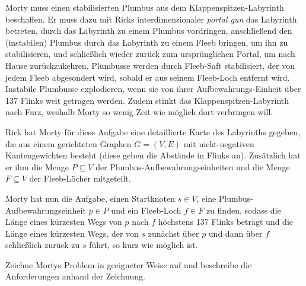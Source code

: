 \documentclass{uebung_cs}
\begin{document}
\begin{exercise}
  Morty muss einen stabilisierten Plumbus aus dem Klappen\-spitzen-Labyrinth beschaffen.
  Er muss dazu mit Ricks interdimensionaler \textit{portal gun} das Labyrinth betreten, durch das Labyrinth zu einem Plumbus vordringen, anschließend den (instabilen) Plumbus durch das Labyrinth zu einem Fleeb bringen, um ihn zu stabilisieren, und schließlich wieder zurück zum ursprünglichen Portal, um nach Hause zurückzukehren.
  Plumbusse werden durch Fleeb-Saft stabilisiert, der von jedem Fleeb abgesondert wird, sobald er aus seinem Fleeb-Loch entfernt wird.
  Instabile Plumbusse explodieren, wenn sie von ihrer Aufbewahrungs-Einheit über 137 Flinks weit getragen werden.
  Zudem stinkt das Klappenspitzen-Labyrinth nach Furz, weshalb Morty so wenig Zeit wie möglich dort verbringen will.

  Rick hat Morty für diese Aufgabe eine detaillierte Karte des Labyrinths gegeben, die aus einem gerichteten Graphen $G = (V,E)$ mit nicht-negativen Kantengewichten besteht (diese geben die Abstände in Flinks an).
  Zusätzlich hat er ihm die Menge $P \subseteq V$ der Plumbus-Aufbewahrungseinheiten und die Menge $F \subseteq V$ der Fleeb-Löcher mitgeteilt.
  
  Morty hat nun die Aufgabe, einen Startknoten $s \in V$, eine Plumbus-Aufbewahrungseinheit $p \in P$ und ein Fleeb-Loch $f \in F$ zu finden, sodass die Länge eines kürzesten Wegs von $p$ nach $f$ höchstens 137 Flinks beträgt und die Länge eines kürzesten Wegs, der von $s$ zunächst über $p$ und dann über $f$ schließlich zurück zu $s$ führt, so kurz wie möglich ist.

  Zeichne Mortys Problem in geeigneter Weise auf und beschreibe die Anforderungen anhand der Zeichnung.
\end{exercise}
\newpage
\end{document}
